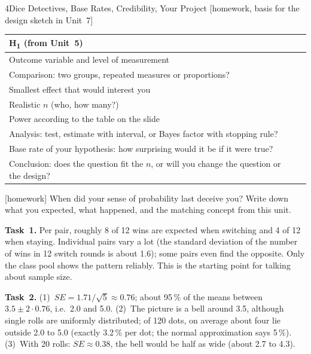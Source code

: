 \begin{uebungsblattb}{4}{Dice Detectives, Base Rates, Credibility, Your Project}
[homework, basis for the design sketch in Unit~7]
\begin{center}
\renewcommand{\arraystretch}{1.5}
\begin{tabular}{|p{}|p{}|}
\hline
H\textsubscript{1} (from Unit~5) & \\[6mm] \hline
Outcome variable and level of measurement & \\ \hline
Comparison: two groups, repeated measures or proportions? & \\ \hline
Smallest effect that would interest you & \\ \hline
Realistic $n$ (who, how many?) & \\ \hline
Power according to the table on the slide & \\ \hline
Analysis: test, estimate with interval, or Bayes factor with stopping rule? & \\ \hline
Base rate of your hypothesis: how surprising would it be if it were true? & \\ \hline
Conclusion: does the question fit the $n$, or will you change the question or the design? & \\[6mm] \hline
\end{tabular}
\end{center}

[homework]
When did your sense of probability last deceive you? Write down what you
expected, what happened, and the matching concept from this unit.

\begin{lehrhinweis}
\textbf{Task~1.} Per pair, roughly 8 of 12 wins are expected when
switching and 4 of 12 when staying. Individual pairs vary a lot (the
standard deviation of the number of wins in 12 switch rounds is about
1.6); some pairs even find the opposite. Only the class pool shows the
pattern reliably. This is the starting point for talking about sample
size.

\textbf{Task~2.} (1)~$\mathit{SE}=1.71/\sqrt5\approx0.76$; about
95\,\% of the means between $3.5\pm2\cdot0.76$, i.e.\ 2.0 and 5.0.
(2)~The picture is a bell around 3.5, although single rolls are uniformly
distributed; of 120 dots, on average about four lie outside 2.0 to 5.0
(exactly 3.2\,\% per dot; the normal approximation says 5\,\%). (3)~With
20 rolls: $\mathit{SE}\approx0.38$, the bell would be half as wide (about
2.7 to 4.3).


\end{lehrhinweis}
\end{uebungsblattb}

